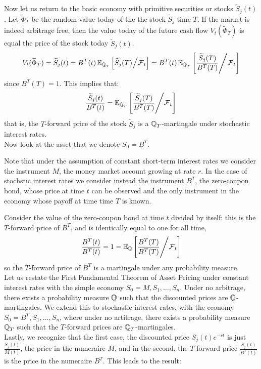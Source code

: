 \documentclass[11pt]{article}
\begin{document}
Now let us return to the basic economy with primitive securities or stocks $\widetilde{S}_j(t)$. Let $\widetilde{\Phi}_T$ be the random value today of the  the stock $\widetilde{S}_j$ time $T$. If the market is indeed arbitrage free, then the value today of the future cash flow $V_t(\widetilde{\Phi}_T)$ is equal the price of the stock today $\widetilde{S}_j(t)$.
$$V_t(\widetilde{\Phi}_T) = \widetilde{S}_j(t) = B^T(t) \operatorname{\mathbb E}_{\operatorname{\mathbb Q}_T} \left[ \widetilde{S}_j(T) \middle/ \operatorname{\mathcal F}_t \right] = B^T(t) \operatorname{\mathbb E}_{\operatorname{\mathbb Q}_T} \left[ \frac{\widetilde{S}_j(T)}{B^T(T)} \middle/ \operatorname{\mathcal F}_t \right]$$
since $B^T(T) = 1$. This implies that:
$$\frac {\widetilde{S}_j(t)}{B^T(t)} = \operatorname{\mathbb E}_{\operatorname{\mathbb Q}_T} \left[ \frac{\widetilde{S}_j(T)}{B^T(T)} \middle/ \operatorname{\mathcal F}_t \right]$$
that is, the $T$-forward price of the stock $\widetilde{S}_j$ is a $\operatorname{\mathbb Q}_T$-martingale under stochastic interest rates.\\

Now look at the asset that we denote $S_0 = B^T$.
\begin{remark}
Note that under the assumption of constant short-term interest rates we consider the instrument $M$, the money market account growing at rate $r$. In the case of stochstic interest rates we consider instead the instrument $B^T$, the zero-coupon bond, whose price at time $t$ can be observed and the only instrument in the economy whose payoff at time time $T$ is known.
\end{remark}
Consider the value of the zero-coupon bond at time $t$ divided by itself: this is the $T$-forward price of $B^T$, and is identically equal to one for all time,
$$\frac {B^T(t)}{B^T(t)} = 1 = \operatorname{\mathbb E}_{\operatorname{\mathbb Q}} \left[ \frac{B^T(T)}{B^T(T)} \middle/ \operatorname{\mathcal F}_t \right]$$
so the $T$-forward price of $B^T$ is a martingale under any probability measure. \\

Let us restate the First Fundamental Theorem of Asset Pricing under constant interest rates with the simple economy $S_0=M, S_1, \dots, S_n$. Under no arbitrage, there exists a probability measure $\operatorname{\mathbb Q}$ such that the discounted prices are $\operatorname{\mathbb Q}$-martingales. We extend this to stochastic interest rates, with the economy $S_0=B^T, S_1, \dots, S_n$, where under no artitrage, there exists a probability measure $\operatorname{\mathbb Q}_T$ such that the $T$-forward prices are $\operatorname{\mathbb Q}_T$-martingales. \\

Lastly, we recognize that the first case, the discounted price $S_j(t)e^{-rt}$ is just $\frac{S_j(t)}{M(t)}$, the price in the numeraire $M$, and in the second, the $T$-forward price $\frac{S_j(t)}{B^T(t)}$ is the price in the numeraire $B^T$. This leads to the result:
\end{document}
